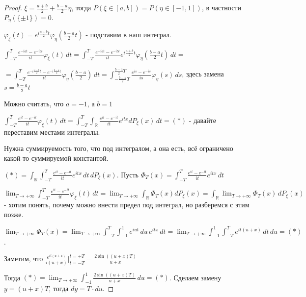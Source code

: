 \begin{proof}

    $\xi = \frac{a + b}{2} + \frac{b - a}{2}\eta$, тогда $P(\xi \in [a, b]) = P(\eta \in [-1, 1])$, в частности $P_{\eta}(\{ \pm 1 \}) = 0$.

    $\varphi_{\xi}(t) = e^{i \frac{a + b}{2} t} \varphi_{\eta}(\frac{b - a}{2}t)$ - подставим в наш интеграл.

    $ \int_{-T}^{T} \frac{e^{-iat} - e^{-ibt}}{it} \varphi_{\xi} (t) \, dt = \int_{-T}^{T} \frac{e^{-iat} - e^{-ibt}}{it} e^{i \frac{a + b}{2} t} \varphi_{\eta} (\frac{b - a}{2} t) \, dt = $

    $ = \int_{-T}^{T} \frac{e^{-i\frac{a - b}{2}t} - e^{-i\frac{b - a}{2}t}}{it} \varphi_{\eta} (\frac{b - a}{2}) \, dt = \int_{-\frac{b - a}{2}T}^{\frac{b - a}{2}T} \frac{e^{is} - e^{-is}}{is} \varphi_{\eta} (s) \, ds$, здесь замена $s = \frac{b - a}{2} t$

    Можно считать, что $a = -1$, а $b = 1$

    $\int_{-T}^T \frac{e^{it} - e^{-it}}{it} \varphi_{\xi}(t) \, dt = \int_{-T}^T \int_{\mathbb{R}} \frac{e^{it} - e^{-it}}{it} e^{itx} dP_{\xi}(x) \, dt = (*)$ - давайте переставим местами интегралы.
    
    Нужна суммируемость того, что под интегралом, а она есть, всё ограничено какой-то суммируемой константой.
    
    $(*) = \int_{\mathbb{R}} \int_{-T}^T \frac{e^{it} - e^{-it}}{it} e^{itx} \, dt \, dP_{\xi}(x)$.  Пусть $\Phi_T (x) = \int_{-T}^{T} \frac{e^{it} - e^{-it}}{it} e^{itx} \, dt$

    $\lim_{T \to +\infty} \int_{-T}^T \frac{e^{it} - e^{-it}}{it} \varphi_{\xi} (t) \, dt = \lim_{T \to +\infty} \int_{\mathbb{R}} \Phi_T(x) dP_{\xi} (x) = \int_{\mathbb{R}} \lim_{T \to +\infty} \Phi_T (x) \, dP_{\xi} (x) $ - хотим понять, почему 
    можно внести предел под интеграл, но разберемся с этим позже.

    $\lim_{T \to +\infty} \Phi_T (x) = \lim_{T \to +\infty} \int_{-T}^{T} \int_{-1}^1 e^{iut} \, du \, e^{itx} \, dt = \lim_{T \to +\infty} \int_{-1}^1 \int_{-T}^T e^{it(u + x)} \, dt \, du = (*)$.

    Заметим, что $\frac{e^{it(u + x)}}{i(u + x)} \bigg |_{t = -T}^{t = +T} = \frac{2\sin ((u + x)T)}{u + x}$

    Тогда $(*) = \lim_{T \to +\infty} \int_{-1}^1 \frac{2\sin ((u + x)T)}{u + x} \, du = (*)$. Сделаем замену $y = (u + x)T$, тогда $dy = T \cdot du$.


\end{proof}
